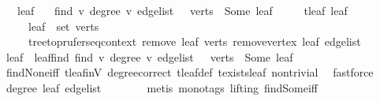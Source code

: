 \begin{isabellebody}
\ \ \ leaf\isanewline
\ \ \ {\isachardoublequoteopen}find\ {\isacharparenleft}{\kern0pt}{\isasymlambda}v{\isachardot}{\kern0pt}\ degree\ v\ edge{\isacharunderscore}{\kern0pt}list\ {\isacharequal}{\kern0pt}\ {}{\isacharparenright}{\kern0pt}\ verts\ {\isacharequal}{\kern0pt}\ Some\ leaf{\isachardoublequoteclose}\isanewline
\ \ \ \ \ {\isachardoublequoteopen}t{\isachardot}{\kern0pt}leaf\ leaf{\isachardoublequoteclose}\isanewline
\ \ \ \ \ {\isachardoublequoteopen}leaf\ {\isasymin}\ set\ verts{\isachardoublequoteclose}\isanewline
\ \ \ \ \ {\isachardoublequoteopen}tree{\isacharunderscore}{\kern0pt}to{\isacharunderscore}{\kern0pt}prufer{\isacharunderscore}{\kern0pt}seq{\isacharunderscore}{\kern0pt}context\ {\isacharparenleft}{\kern0pt}remove{}\ leaf\ verts{\isacharparenright}{\kern0pt}\ {\isacharparenleft}{\kern0pt}remove{\isacharunderscore}{\kern0pt}vertex\ leaf\ edge{\isacharunderscore}{\kern0pt}list{\isacharparenright}{\kern0pt}{\isachardoublequoteclose}\isanewline
%
\isadelimproof
%
\endisadelimproof
%
\isatagproof
{}\isamarkupfalse%
{\isacharminus}{\kern0pt}\isanewline
\ \ \isamarkupfalse%
\ leaf\ \ leaf{\isacharunderscore}{\kern0pt}find{\isacharcolon}{\kern0pt}\ {\isachardoublequoteopen}find\ {\isacharparenleft}{\kern0pt}{\isasymlambda}v{\isachardot}{\kern0pt}\ degree\ v\ edge{\isacharunderscore}{\kern0pt}list\ {\isacharequal}{\kern0pt}\ {}{\isacharparenright}{\kern0pt}\ verts\ {\isacharequal}{\kern0pt}\ Some\ leaf{\isachardoublequoteclose}\isanewline
\ \ \ \ \isamarkupfalse%
\ find{\isacharunderscore}{\kern0pt}None{\isacharunderscore}{\kern0pt}iff{}\ t{\isachardot}{\kern0pt}leaf{\isacharunderscore}{\kern0pt}in{\isacharunderscore}{\kern0pt}V\ degree{\isacharunderscore}{\kern0pt}correct\ t{\isachardot}{\kern0pt}leaf{\isacharunderscore}{\kern0pt}def\ t{\isachardot}{\kern0pt}exists{\isacharunderscore}{\kern0pt}leaf\ non{\isacharunderscore}{\kern0pt}trivial\ \isamarkupfalse%
\ fastforce\isanewline
\ \ \isamarkupfalse%
\ \isamarkupfalse%
\ {\isachardoublequoteopen}degree\ leaf\ edge{\isacharunderscore}{\kern0pt}list\ {\isacharequal}{\kern0pt}\ {}{\isachardoublequoteclose}\isanewline
\ \ \ \ \isamarkupfalse%
\ {\isacharparenleft}{\kern0pt}metis\ {\isacharparenleft}{\kern0pt}mono{\isacharunderscore}{\kern0pt}tags{\isacharcomma}{\kern0pt}\ lifting{\isacharparenright}{\kern0pt}\ find{\isacharunderscore}{\kern0pt}Some{\isacharunderscore}{\kern0pt}iff{\isacharparenright}{\kern0pt}\isanewline

\end{isabellebody}
